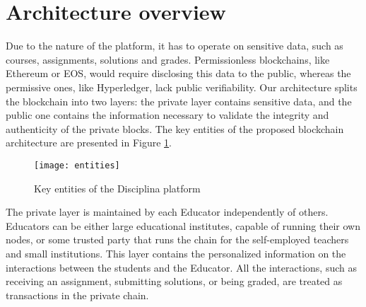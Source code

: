 \section{Architecture overview}
\label{sec:architecture}

Due to the nature of the platform, it has to operate on sensitive data, such as courses, assignments, solutions and grades. Permissionless blockchains, like Ethereum or EOS, would require disclosing this data to the public, whereas the permissive ones, like Hyperledger, lack public verifiability. Our architecture splits the blockchain into two layers: the private layer contains sensitive data, and the public one contains the information necessary to validate the integrity and authenticity of the private blocks. The key entities of the proposed blockchain architecture are presented in Figure \ref{fig:entities}.

\begin{figure}[ht]
\centering
\texttt{[image: entities]}
\caption{Key entities of the Disciplina platform}
\label{fig:entities}
\end{figure}

The private layer is maintained by each Educator independently of others. Educators can be either large educational institutes, capable of running their own nodes, or some trusted party that runs the chain for the self-employed teachers and small institutions. This layer contains the personalized information on the interactions between the students and the Educator. All the interactions, such as receiving an assignment, submitting solutions, or being graded, are treated as transactions in the private chain.

